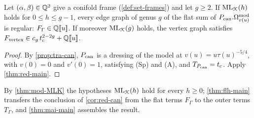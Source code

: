 \begin{cor}
\label{cor:red-can}
Let $(\alpha,\beta)\in\mathbb{Q}^2$ give a conifold frame (\cref{def:set-frames}) and let $g\geq 2$. If $\mathrm{ML}_{\mathcal{K}}(h)$ holds for $0\leq h\leq g-1$, every edge graph of genus $g$ of the flat sum of $P_{\mathrm{can}}.\Omega^{\mathrm{mod}}_{v(u)}$ is regular: $F_\Gamma\in\mathbb{Q}[\![ u ]\!]$. If moreover $\mathrm{ML}_{\mathcal{K}}(g)$ holds, the vertex graph satisfies $F_{\mathrm{vertex}}\in c_g\,t_{\mathrm{c}}^{2-2g}+\mathbb{Q}[\![ u ]\!]$.
\end{cor}

\begin{proof}
By \cref{prop:tra-can}, $P_{\mathrm{can}}$ is a dressing of the model at $v(u) = u\tau(u)^{-5/4}$, with $v(0) = 0$ and $v'(0) = 1$, satisfying (Sp) and (A), and $T_{P_{\mathrm{can}}} = t_{\mathrm{c}}$. Apply \cref{thm:red-main}.
\end{proof}

By \cref{thm:mod-MLK} the hypotheses $\mathrm{ML}_{\mathcal{K}}(h)$ hold for every $h\geq 0$; \cref{thm:flh-main} transfers the conclusion of \cref{cor:red-can} from the flat terms $F_\Gamma$ to the outer terms $T_\Gamma$, and \cref{thm:mai-main} assembles the result.
